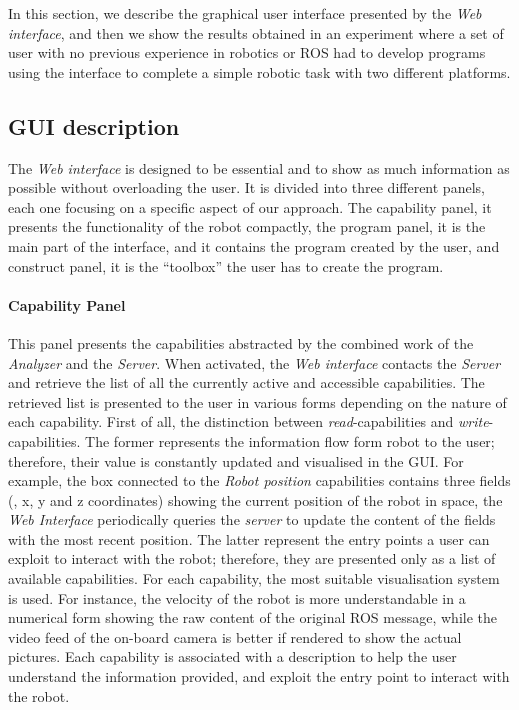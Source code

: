 In this section, we describe the graphical user interface presented by the \textit{Web interface}, and then we show the results obtained in an experiment where a set of user with no previous experience in robotics or ROS had to develop programs using the interface to complete a simple robotic task with two different platforms.

\subsection{GUI description}
The \textit{Web interface} is designed to be essential and to show as much information as possible without overloading the user. It is divided into three different panels, each one focusing on a specific aspect of our approach. The capability panel, it presents the functionality of the robot compactly, the program panel, it is the main part of the interface, and it contains the program created by the user, and construct panel, it is the ``toolbox'' the user has to create the program.

\paragraph{Capability Panel} This panel presents the capabilities abstracted by the combined work of the \textit{Analyzer} and the \textit{Server}. When activated, the \textit{Web interface} contacts the \textit{Server} and retrieve the list of all the currently active and accessible capabilities. The retrieved list is presented to the user in various forms depending on the nature of each capability. First of all, the distinction between \textit{read}-capabilities and \textit{write}-capabilities. The former represents the information flow form robot to the user; therefore, their value is constantly updated and visualised in the GUI. For example, the box connected to the \textit{Robot position} capabilities contains three fields (\ie, x, y and z coordinates) showing the current position of the robot in space, the \textit{Web Interface} periodically queries the \textit{server} to update the content of the fields with the most recent position. The latter represent the entry points a user can exploit to interact with the robot; therefore, they are presented only as a list of available capabilities. For each capability, the most suitable visualisation system is used. For instance, the velocity of the robot is more understandable in a numerical form showing the raw content of the original ROS message, while the video feed of the on-board camera is better if rendered to show the actual pictures. Each capability is associated with a description to help the user understand the information provided, and exploit the entry point to interact with the robot.

